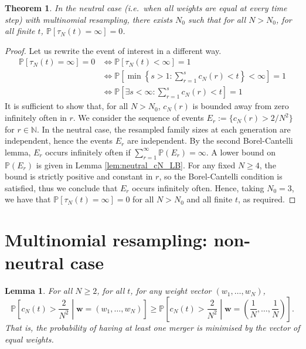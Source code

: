 \documentclass{article}
\newtheorem{thm}{Theorem}
\newtheorem{lemma}{Lemma}
\newcommand{\PR}{\mathbb{P}}
\begin{document}
\begin{thm}\label{thm:nontrivial_mn_optimalw}
In the neutral case (i.e.\ when all weights are equal at every time step) with multinomial resampling, there exists $N_0$ such that for all $N>N_0$, for all finite $t$, $\PR[\tau_N(t) = \infty] =0$.
\end{thm}

\begin{proof}
Let us rewrite the event of interest in a different way.
\begin{align*}
\PR[\tau_N(t) = \infty] =0 &\Leftrightarrow \PR[\tau_N(t) < \infty] =1 \\
&\Leftrightarrow \PR\left[ \min \left\{s>1 : \sum_{r=1}^s c_N(r) <t \right\} < \infty \right] =1 \\
&\Leftrightarrow \PR\left[ \exists s<\infty : \sum_{r=1}^s c_N(r) <t \right] =1
\end{align*}
It is sufficient to show that, for all $N>N_0$, $c_N(r)$ is bounded away from zero infinitely often in $r$.
We consider the sequence of events 
$E_r := \{ c_N(r) > 2/N^2 \}$ for $r \in \mathbb{N}$.
In the neutral case, the resampled family sizes at each generation are independent, hence the events $E_r$ are independent. 
By the second Borel-Cantelli lemma, $E_r$ occurs infinitely often if $\sum_{r=1}^\infty \PR(E_r) = \infty$. 
A lower bound on $\PR(E_r)$ is given in Lemma \ref{lem:neutral_cN_LB}. 
For any fixed $N\geq 4$, the bound is strictly positive and constant in $r$, so the Borel-Cantelli condition is satisfied, thus we conclude that $E_r$ occurs infinitely often.
Hence, taking $N_0=3$, we have that $\PR[\tau_N(t) = \infty] =0$ for all $N>N_0$ and all finite $t$, as required.
\end{proof}

\section*{Multinomial resampling: non-neutral case}

\begin{lemma}\label{lem:mn_optimal_w}
For all $N\geq 2$, for all $t$, for any weight vector $(w_1, \dots, w_N)$,
\begin{equation*}
\PR \left[c_N(t) > \frac{2}{N^2} \middle| \mathbf{w}=(w_1, \dots, w_N) \right]
\geq \PR \left[c_N(t) > \frac{2}{N^2} \middle| \mathbf{w}=\left( \frac{1}{N}, \dots, \frac{1}{N} \right) \right] .
\end{equation*}
That is, the probability of having at least one merger is minimised by the vector of equal weights.
\end{lemma}
\end{document}
